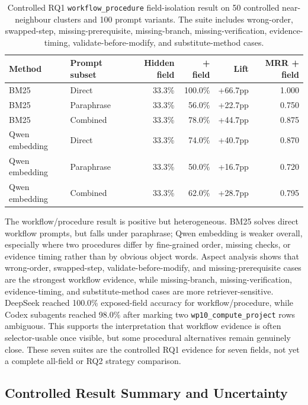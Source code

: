 \begin{table}[H]
\centering
\scriptsize
\setlength{\tabcolsep}{2pt}
\begin{tabular}{p{}p{}rrrr}
\toprule
Method & Prompt subset & Hidden field & + field & Lift & MRR + field \\
\midrule
BM25 & Direct & 33.3\% & 100.0\% & +66.7pp & 1.000 \\
BM25 & Paraphrase & 33.3\% & 56.0\% & +22.7pp & 0.750 \\
BM25 & Combined & 33.3\% & 78.0\% & +44.7pp & 0.875 \\
Qwen embedding & Direct & 33.3\% & 74.0\% & +40.7pp & 0.870 \\
Qwen embedding & Paraphrase & 33.3\% & 50.0\% & +16.7pp & 0.720 \\
Qwen embedding & Combined & 33.3\% & 62.0\% & +28.7pp & 0.795 \\
\bottomrule
\end{tabular}
\caption{Controlled RQ1 \texttt{workflow\_procedure} field-isolation result on 50 controlled near-neighbour clusters and 100 prompt variants. The suite includes wrong-order, swapped-step, missing-prerequisite, missing-branch, missing-verification, evidence-timing, validate-before-modify, and substitute-method cases.}
\label{tab:rq1a-workflow-procedure-isolation}
\end{table}

The workflow/procedure result is positive but heterogeneous. BM25 solves direct workflow prompts, but falls under paraphrase; Qwen embedding is weaker overall, especially where two procedures differ by fine-grained order, missing checks, or evidence timing rather than by obvious object words. Aspect analysis shows that wrong-order, swapped-step, validate-before-modify, and missing-prerequisite cases are the strongest workflow evidence, while missing-branch, missing-verification, evidence-timing, and substitute-method cases are more retriever-sensitive. DeepSeek reached 100.0\% exposed-field accuracy for workflow/procedure, while Codex subagents reached 98.0\% after marking two \texttt{wp10\_compute\_project} rows ambiguous. This supports the interpretation that workflow evidence is often selector-usable once visible, but some procedural alternatives remain genuinely close. These seven suites are the controlled RQ1 evidence for seven fields, not yet a complete all-field or RQ2 strategy comparison.

\fi

\subsection{Controlled Result Summary and Uncertainty}

